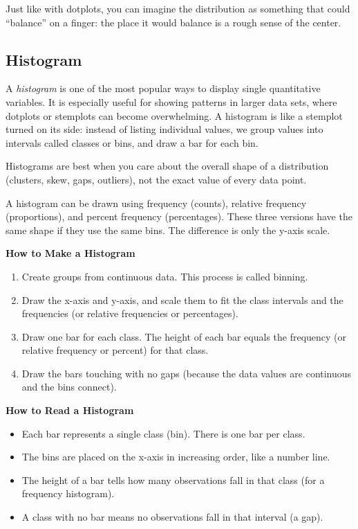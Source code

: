 Just like with dotplots, you can imagine the distribution as something that could ``balance'' on a finger:
the place it would balance is a rough sense of the center.


\subsection{Histogram}

A \textit{histogram} is one of the most popular ways to display single quantitative variables.
It is especially useful for showing patterns in larger data sets, where dotplots or stemplots can become
overwhelming. A histogram is like a stemplot turned on its side: instead of listing individual values, we group values
into intervals called classes or bins, and draw a bar for each bin.

Histograms are best when you care about the overall shape of a distribution (clusters, skew, gaps, outliers),
not the exact value of every data point.

A histogram can be drawn using frequency (counts), relative frequency (proportions), and percent frequency (percentages). These three versions have the same shape if they use the same bins. The difference is only the y-axis scale.

\textbf{How to Make a Histogram}
\begin{enumerate}
    \item Create groups from continuous data. This process is called binning.
    \item Draw the x-axis and y-axis, and scale them to fit the class intervals and the frequencies
    (or relative frequencies or percentages).
    \item Draw one bar for each class. The height of each bar equals the frequency (or relative frequency or percent)
    for that class.
    \item Draw the bars touching with no gaps (because the data values are continuous and the bins connect).
\end{enumerate}

\textbf{How to Read a Histogram}

\begin{itemize}
    \item Each bar represents a single class (bin). There is one bar per class.
    \item The bins are placed on the x-axis in increasing order, like a number line.
    \item The height of a bar tells how many observations fall in that class (for a frequency histogram).
    \item A class with no bar means no observations fall in that interval (a gap).
\end{itemize}

